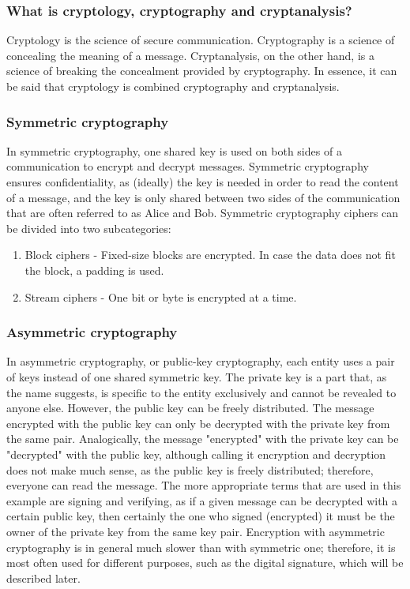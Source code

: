 \subsubsection{What is cryptology, cryptography and cryptanalysis?}
Cryptology is the science of secure communication. Cryptography is a science of concealing the meaning of a message. Cryptanalysis, on the other hand, is a science of breaking the concealment provided by cryptography. In essence, it can be said that cryptology is combined cryptography and cryptanalysis.

\subsubsection{Symmetric cryptography}
In symmetric cryptography, one shared key is used on both sides of a communication to encrypt and decrypt messages. Symmetric cryptography ensures confidentiality, as (ideally) the key is needed in order to read the content of a message, and the key is only shared between two sides of the communication that are often referred to as Alice and Bob. Symmetric cryptography ciphers can be divided into two subcategories:
\begin{enumerate}
    \item Block ciphers - Fixed-size blocks are encrypted. In case the data does not fit the block, a padding is used.
    \item Stream ciphers - One bit or byte is encrypted at a time.
\end{enumerate}

\subsubsection{Asymmetric cryptography}
In asymmetric cryptography, or public-key cryptography, each entity uses a pair of keys instead of one shared symmetric key. The private key is a part that, as the name suggests, is specific to the entity exclusively and cannot be revealed to anyone else. However, the public key can be freely distributed. The message encrypted with the public key can only be decrypted with the private key from the same pair. Analogically, the message "encrypted" with the private key can be "decrypted" with the public key, although calling it encryption and decryption does not make much sense, as the public key is freely distributed; therefore, everyone can read the message. The more appropriate terms that are used in this example are signing and verifying, as if a given message can be decrypted with a certain public key, then certainly the one who signed (encrypted) it must be the owner of the private key from the same key pair.
Encryption with asymmetric cryptography is in general much slower than with symmetric one; therefore, it is most often used for different purposes, such as the digital signature, which will be described later.

